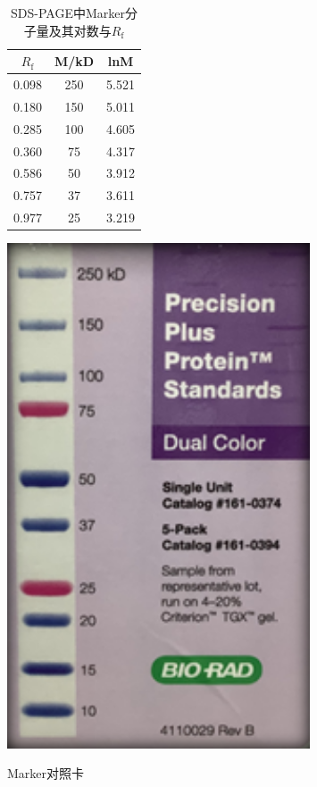 \begin{figure}[H]  
\centering  
\begin{minipage}[t]{0.69\textwidth}  
\centering  
\begin{table}[H]  
\centering  
\caption{SDS-PAGE中Marker分子量及其对数与$R_\text{f}$}  
\label{tab:SDS-PAGE_marker}  
\begin{tabular}{@{}ccc@{}}  
\toprule  
$R_\text{f}$    & M/kD & lnM   \\ \midrule  
0.098 & 250  & 5.521 \\  
0.180 & 150  & 5.011 \\  
0.285 & 100  & 4.605 \\  
0.360 & 75   & 4.317 \\  
0.586 & 50   & 3.912 \\  
0.757 & 37   & 3.611 \\  
0.977 & 25   & 3.219 \\ \bottomrule  
\end{tabular}  
\end{table}  
\end{minipage}%
\begin{minipage}[t]{0.3\textwidth}  
\centering  
\caption{Marker对照卡}  
\includegraphics[width=0.8\textwidth]{figure/Electro/image.png}  
\label{fig:Marker_Standard}  
\end{minipage}  
\end{figure}  

